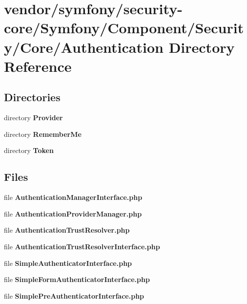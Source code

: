 \section{vendor/symfony/security-\/core/\+Symfony/\+Component/\+Security/\+Core/\+Authentication Directory Reference}
\label{dir_df61e78548ec57859373eedf23fe469c}
\subsection*{Directories}
\begin{DoxyCompactItemize}
\item 
directory {\bf Provider}
\item 
directory {\bf Remember\+Me}
\item 
directory {\bf Token}
\end{DoxyCompactItemize}
\subsection*{Files}
\begin{DoxyCompactItemize}
\item 
file {\bf Authentication\+Manager\+Interface.\+php}
\item 
file {\bf Authentication\+Provider\+Manager.\+php}
\item 
file {\bf Authentication\+Trust\+Resolver.\+php}
\item 
file {\bf Authentication\+Trust\+Resolver\+Interface.\+php}
\item 
file {\bf Simple\+Authenticator\+Interface.\+php}
\item 
file {\bf Simple\+Form\+Authenticator\+Interface.\+php}
\item 
file {\bf Simple\+Pre\+Authenticator\+Interface.\+php}
\end{DoxyCompactItemize}
